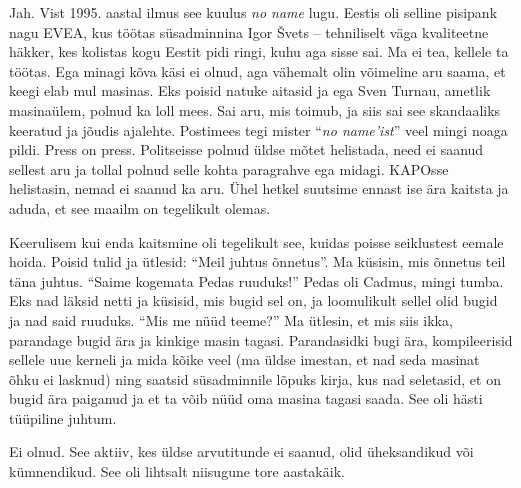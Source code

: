 
Jah. Vist 1995. aastal ilmus see kuulus \emph{no name} 
lugu. Eestis oli selline pisipank nagu EVEA, kus töötas süsadminnina Igor 
Švets -- tehniliselt väga 
kvaliteetne häkker, kes kolistas kogu Eestit pidi ringi, kuhu aga sisse sai. Ma 
ei tea, kellele ta töötas. Ega minagi kõva käsi ei 
olnud, aga vähemalt olin võimeline aru saama, et keegi elab mul 
masinas. Eks poisid natuke aitasid ja ega Sven Turnau, 
ametlik masinaülem, polnud ka loll mees. Sai aru, mis toimub, ja siis sai see 
skandaaliks keeratud ja jõudis ajalehte. Postimees tegi mister \enquote{\emph{no name'ist}} veel mingi noaga pildi. Press on press. 
Politseisse polnud üldse mõtet helistada, need ei saanud sellest aru ja tollal 
polnud selle kohta paragrahve ega midagi. KAPOsse helistasin, nemad ei saanud ka aru. Ühel hetkel suutsime ennast ise ära kaitsta ja aduda, et see maailm 
on tegelikult olemas. 

Keerulisem kui enda kaitsmine oli tegelikult see, 
kuidas poisse seiklustest eemale hoida. Poisid tulid ja
ütlesid: \enquote{Meil juhtus õnnetus}. Ma küsisin, mis 
õnnetus teil täna juhtus. \enquote{Saime kogemata Pedas ruuduks!} 
Pedas oli Cadmus, mingi 
tumba. Eks nad läksid netti ja küsisid, mis bugid sel on, ja 
loomulikult sellel olid bugid ja nad said ruuduks. \enquote{Mis me nüüd teeme?} Ma 
ütlesin, et mis siis ikka, parandage bugid ära ja kinkige masin 
tagasi. Parandasidki bugi ära, kompileerisid sellele uue kerneli ja mida kõike veel (ma üldse imestan, et nad seda masinat õhku ei lasknud) ning
saatsid süsadminnile lõpuks kirja, kus nad seletasid, et on bugid ära 
paiganud ja et ta võib nüüd oma masina tagasi saada. See oli hästi 
tüüpiline juhtum.


Ei olnud. See aktiiv, kes üldse arvutitunde ei saanud, olid üheksandikud või 
kümnendikud. See oli lihtsalt niisugune tore aastakäik. 

